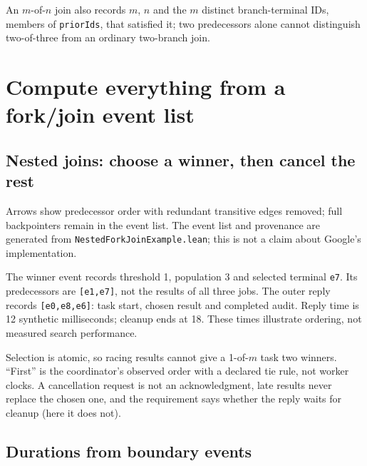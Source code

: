 An $m$-of-$n$ join also records $m$, $n$ and the $m$ distinct branch-terminal IDs,
members of \texttt{priorIds}, that satisfied it; two predecessors alone cannot
distinguish two-of-three from an ordinary two-branch join.

\section{Compute everything from a fork/join event list}

\subsection{Nested joins: choose a winner, then cancel the rest}

\begin{center}
\end{center}
\noindent Arrows show predecessor order with redundant transitive edges removed; full
backpointers remain in the event list. The event list and provenance are generated from
\texttt{NestedForkJoinExample.lean}; this is not a claim about Google's implementation.

The winner event records threshold 1, population 3 and selected terminal
\texttt{e7}. Its predecessors are \texttt{[e1,e7]}, not the results of all
three jobs. The outer reply records \texttt{[e0,e8,e6]}: task start, chosen result
and completed audit. Reply time is 12 synthetic milliseconds; cleanup ends at
18. These times illustrate ordering, not measured search performance.

Selection is atomic, so racing results cannot give a 1-of-$m$ task two winners.
``First'' is the coordinator's observed order with a declared tie rule, not worker
clocks. A cancellation request is not an acknowledgment, late results never
replace the chosen one, and the requirement says whether the reply waits for
cleanup (here it does not).

\subsection{Durations from boundary events}


